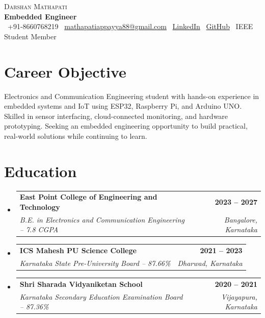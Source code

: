 \documentclass[letterpaper,11pt]{article}
\makeatletter
\newcommand{\resumeSubheading}[4]{
  \vspace{-2pt}\item
  \begin{tabular*}{1.0\textwidth}[t]{l@{\extracolsep{\fill}}r}
    \textbf{#1} & \textbf{\small #2}\\
    \textit{\small #3} & \textit{\small #4}\\
  \end{tabular*}\vspace{-7pt}
}
\newcommand{\resumeSubHeadingListStart}{\begin{itemize}[leftmargin=0.0in,label={}]}
\newcommand{\resumeSubHeadingListEnd}{\end{itemize}}
\makeatother
\begin{document}
\begin{center}
{\fontsize{18}{20}\selectfont \scshape Darshan Mathapati}\\[4pt]
{\large \textbf{Embedded Engineer}}\\[4pt]
\small
\faPhone\ +91-8660768219 \hspace{0.6cm}
\faEnvelope\ \href{mailto:mathapatiappayya88@gmail.com}{mathapatiappayya88@gmail.com} \hspace{0.6cm}
\faLinkedin\ \href{https://www.linkedin.com/in/darshan-mathapati-0384792a6}{LinkedIn} \hspace{0.6cm}
\faGithub\ \href{https://github.com/mathapatiappayya88-dm}{GitHub} \hspace{0.6cm}
\faUsers\ IEEE Student Member
\end{center}
\vspace{-6pt}

\section{Career Objective}
\small{
Electronics and Communication Engineering student with hands-on experience in embedded systems and IoT using ESP32, Raspberry Pi, and Arduino UNO. Skilled in sensor interfacing, cloud-connected monitoring, and hardware prototyping. Seeking an embedded engineering opportunity to build practical, real-world solutions while continuing to learn.
}
\vspace{-6pt}

\section{Education}
\resumeSubHeadingListStart
\resumeSubheading
{East Point College of Engineering and Technology}{2023 -- 2027}
{B.E. in Electronics and Communication Engineering -- 7.8 CGPA}{Bangalore, Karnataka}
\resumeSubheading
{ICS Mahesh PU Science College}{2021 -- 2023}
{Karnataka State Pre-University Board -- 87.66\%}{Dharwad, Karnataka}
\resumeSubheading
{Shri Sharada Vidyaniketan School}{2020 -- 2021}
{Karnataka Secondary Education Examination Board -- 87.36\%}{Vijayapura, Karnataka}
\resumeSubHeadingListEnd
\vspace{-6pt}

\end{document}
